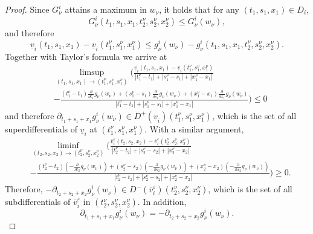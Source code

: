 \documentclass[a4paper]{scrartcl}
\theoremstyle{remark}
\theoremstyle{definition}
\numberwithin{equation}{section}
\begin{document}
\begin{proof}
    \noindent
    Since $G_\nu^i$ attains a maximum in $w_\nu$, it holds that for any $(t_1,s_1,x_1) \in D_i$, 
    \begin{equation*}
        G_\nu^i(t_1,s_1,x_1,t_2^\nu,s_2^\nu,x_2^\nu)\leq G_\nu^i(w_\nu),
    \end{equation*}
    and therefore
    \begin{equation*}
        \underline{v}_i(t_1,s_1,x_1)-\underline{v}_i(t_1^\nu,s_1^\nu,x_1^\nu)\leq g_\nu^i(w_\nu)-g_\nu^i (t_1,s_1,x_1,t_2^\nu,s_2^\nu,x_2^\nu).
    \end{equation*}
    Together with Taylor's formula we arrive at
    \begin{align*}&\limsup_{(t_1,s_1,x_1)\rightarrow (t_1^\nu,s_1^\nu,x_1^\nu)}\biggl(\frac{ \underline{v}_i(t_1,s_1,x_1)-\underline{v}_i(t_1^\nu,s_1^\nu,x_1^\nu)}{|t_1^\nu-t_1|+|s_1^\nu-s_1|+|x_1^\nu-x_1|}\\
        &-\frac{ (t_1^\nu-t_1)\frac{\partial}{\partial t_1}g_\nu(w_\nu)+(s_1^\nu-s_1)\frac{\partial}{\partial s_1}g_\nu(w_\nu)+(x_1^\nu-x_1)\frac{\partial}{\partial x_1}g_\nu(w_\nu)}{|t_1^\nu-t_1|+|s_1^\nu-s_1|+|x_1^\nu-x_1|}\biggr)\leq 0
    \end{align*}
    and therefore $\partial_{t_1+s_1+x_1} g_\nu^i(w_\nu) \in D^+ (\underline{v}_i)(t_1^\nu,s_1^\nu,x_1^\nu)$, which is the set of all superdifferentials of $\underline{v}_i$ at $(t_1^\nu,s_1^\nu,x_1^\nu)$.
    With a similar argument,
     \begin{align*}
        &\liminf_{(t_2,s_2,x_2)\rightarrow (t_2^\nu,s_2^\nu,x_2^\nu)} \biggl(\frac{ \overline{v}^\varepsilon_i(t_2,s_2,x_2)-\overline{v}^\varepsilon_i(t_2^\nu,s_2^\nu,x_2^\nu)}{|t_2^\nu-t_2|+|s_2^\nu-s_2|+|x_2^\nu-x_2|}\\
        &-\frac{(t_2^\nu-t_2)(-\frac{\partial}{\partial t_2}g_\nu(w_\nu))+(s_2^\nu-s_2)(-\frac{\partial}{\partial s_2}g_\nu(w_\nu))+(x_2^\nu-x_2)(-\frac{\partial}{\partial x_2}g_\nu(w_\nu))}{|t_2^\nu-t_2|+|s_2^\nu-s_2|+|x_2^\nu-x_2|}\biggr)\geq 0.
    \end{align*}
    Therefore, $-\partial_{t_2+s_2+x_2} g_\nu^i(w_\nu) \in D^- (\overline{v}^\varepsilon_i)(t_2^\nu,s_2^\nu,x_2^\nu)$, which is the set of all subdifferentials of $\overline{v}^\varepsilon_i$ in $(t_2^\nu,s_2^\nu,x_2^\nu)$. In addition, 
    \begin{equation}
    \label{eq:g_x=-g_y}
        \partial_{t_1+s_1+x_1} g_\nu^i(w_\nu)=-\partial_{t_2+s_2+x_2} g_\nu^i(w_\nu).
    \end{equation}
    

\end{proof}
\end{document}
